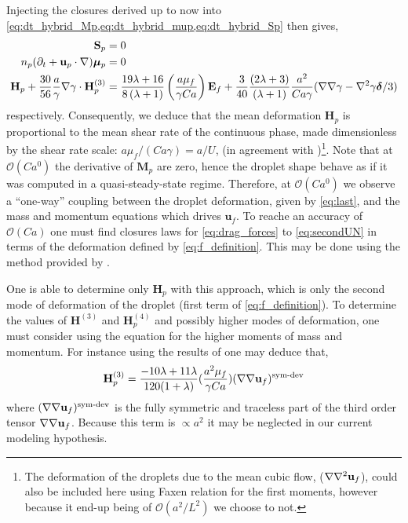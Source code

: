 Injecting the closures derived up to now into \ref{eq:dt_hybrid_Mp,eq:dt_hybrid_mup,eq:dt_hybrid_Sp} then gives,
\begin{align}    
\textbf{S}_p &= 0\\
    n_p (\partial_t + \textbf{u}_p \cdot \mathbf{\nabla})\bm\mu_p &= 0\\
    \textbf{H}_p
    +
    \frac{30}{56}\frac{a}{\gamma}\mathbf{\nabla}\gamma\cdot \textbf{H}^{(3)}_p
    &=
    \frac{19 \lambda + 16}{8 \left(\lambda + 1\right)}
    \left(\frac{a \mu_f}{\gamma Ca}\right)
    \textbf{E}_f
    + 
    \frac{3}{40}\frac{(2\lambda +3)}{(\lambda+1)} 
    \frac{a^2}{Ca\gamma} 
    (\mathbf{\nabla}\mathbf{\nabla}\gamma-\mathbf{\nabla}^2\gamma\bm\delta/3)
\end{align}
respectively. 
Consequently, we deduce that the mean deformation $\textbf{H}_p$ is proportional to the mean shear rate of the continuous phase, made dimensionless by the shear rate scale: $a \mu_f /(Ca \gamma)= a/U$, (in agreement with \citet{leal2007advanced})\footnote{The deformation of the droplets due to the mean cubic flow, ($\mathbf{\nabla}\mathbf{\nabla}^2\textbf{u}_f$), could also be included here using Faxen relation for the first moments, however because it end-up being of $\mathcal{O}(a^2/L^2)$ we choose to not. }.  
Note that at $\mathcal{O}(Ca^0)$ the derivative of $\textbf{M}_p$ are zero, hence the droplet shape behave as if it was computed in a quasi-steady-state regime.
Therefore, at $\mathcal{O}(Ca^0)$ we observe a ``one-way'' coupling between the droplet deformation, given by \ref{eq:last}, and the mass and momentum equations which drives $\textbf{u}_f$. 
To reache an accuracy of $\mathcal{O}(Ca)$ one must find closures laws for \ref{eq:drag_forces} to \ref{eq:secondUN} in terms of the deformation defined by \ref{eq:f_definition}. 
This may be done using the method provided by \cite{brenner1963stokes}. 

One is able to determine only $\textbf{H}_p$ with this approach, which is only the second mode of deformation  of the droplet (first term of \ref{eq:f_definition}).
To determine the values of $\textbf{H}^{(3)}$ and $\textbf{H}_p^{(4)}$ and possibly higher modes of deformation, one must consider using the equation for the higher moments of mass and momentum.
For instance using the results of \citet{nadim1991motion} one may deduce that, 
\begin{equation}
    \textbf{H}_p^{(3)}
    =
    \frac{-10\lambda + 11\lambda}{120(1+\lambda)}(\frac{a^2\mu_f}{\gamma Ca})
    (\mathbf{\nabla}\mathbf{\nabla} \textbf{u}_f)^\text{sym-dev}
\end{equation}
where $(\mathbf{\nabla}\mathbf{\nabla} \textbf{u}_f)^\text{sym-dev}$ is the fully symmetric and traceless part of the third order tensor $\mathbf{\nabla}\mathbf{\nabla} \textbf{u}_f$. 
Because this term is $\propto a^2$ it may be neglected in our current modeling hypothesis. 


